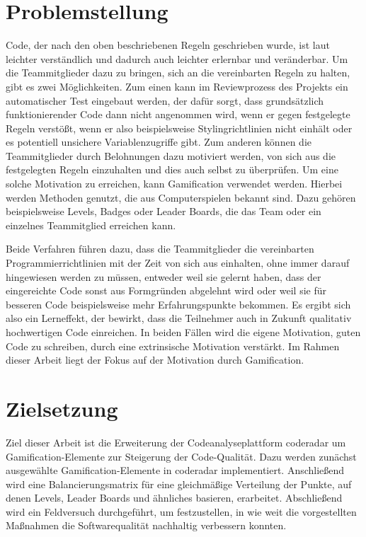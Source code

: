 \documentclass[fontsize=11pt, paper=a4, parskip=half]{scrartcl}
\begin{document}
\section{Problemstellung}
Code, der nach den oben beschriebenen Regeln geschrieben wurde, ist laut \cite{PJ2015} leichter verständlich und dadurch auch leichter erlernbar und veränderbar.
Um die Teammitglieder dazu zu bringen, sich an die vereinbarten Regeln zu halten, gibt es zwei Möglichkeiten.
Zum einen kann im Reviewprozess des Projekts ein automatischer Test eingebaut werden, der dafür sorgt, dass grundsätzlich funktionierender Code dann nicht angenommen wird, wenn er gegen festgelegte Regeln verstößt, wenn er also beispielsweise Stylingrichtlinien nicht einhält oder es potentiell unsichere Variablenzugriffe gibt.
Zum anderen können die Teammitglieder durch Belohnungen dazu motiviert werden, von sich aus die festgelegten Regeln einzuhalten und dies auch selbst zu überprüfen. 
Um eine solche Motivation zu erreichen, kann Gamification verwendet werden.
Hierbei werden Methoden genutzt, die aus Computerspielen bekannt sind.
Dazu gehören beispielsweise Levels, Badges oder Leader Boards, die das Team oder ein einzelnes Teammitglied erreichen kann. 

Beide Verfahren führen dazu, dass die Teammitglieder die vereinbarten Programmierrichtlinien mit der Zeit von sich aus einhalten, ohne immer darauf hingewiesen werden zu müssen, entweder weil sie gelernt haben, dass der eingereichte Code sonst aus Formgründen abgelehnt wird oder weil sie für besseren Code beispielsweise mehr Erfahrungspunkte bekommen.
Es ergibt sich also ein Lerneffekt, der bewirkt, dass die Teilnehmer auch in Zukunft qualitativ hochwertigen Code einreichen.
In beiden Fällen wird die eigene Motivation, guten Code zu schreiben, durch eine extrinsische Motivation verstärkt.
Im Rahmen dieser Arbeit liegt der Fokus auf der Motivation durch Gamification.


\section{Zielsetzung}
Ziel dieser Arbeit ist die Erweiterung der Codeanalyseplattform coderadar um Gamification-Elemente zur Steigerung der Code-Qualität.
Dazu werden zunächst ausgewählte Gamification-Elemente in coderadar implementiert.
Anschließend wird eine Balancierungsmatrix für eine gleichmäßige Verteilung der Punkte, auf denen Levels, Leader Boards und ähnliches basieren, erarbeitet.
Abschließend wird ein Feldversuch durchgeführt, um festzustellen, in wie weit die vorgestellten Maßnahmen die Softwarequalität nachhaltig verbessern konnten.
\end{document}

